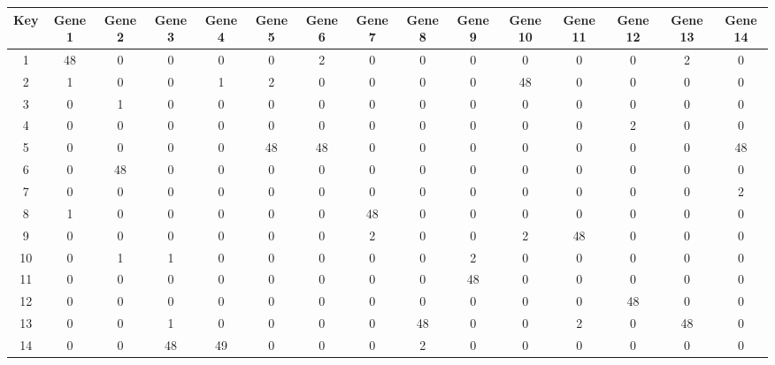 \begin{tabular}{|c|c|c|c|c|c|c|c|c|c|c|c|c|c|c|}
\hline
Key & Gene 1 & Gene 2 & Gene 3 & Gene 4 & Gene 5 & Gene 6 & Gene 7 & Gene 8 & Gene 9 & Gene 10 & Gene 11 & Gene 12 & Gene 13 & Gene 14 \\
\hline
1 & 48 & 0 & 0 & 0 & 0 & 2 & 0 & 0 & 0 & 0 & 0 & 0 & 2 & 0 \\
2 & 1 & 0 & 0 & 1 & 2 & 0 & 0 & 0 & 0 & 48 & 0 & 0 & 0 & 0 \\
3 & 0 & 1 & 0 & 0 & 0 & 0 & 0 & 0 & 0 & 0 & 0 & 0 & 0 & 0 \\
4 & 0 & 0 & 0 & 0 & 0 & 0 & 0 & 0 & 0 & 0 & 0 & 2 & 0 & 0 \\
5 & 0 & 0 & 0 & 0 & 48 & 48 & 0 & 0 & 0 & 0 & 0 & 0 & 0 & 48 \\
6 & 0 & 48 & 0 & 0 & 0 & 0 & 0 & 0 & 0 & 0 & 0 & 0 & 0 & 0 \\
7 & 0 & 0 & 0 & 0 & 0 & 0 & 0 & 0 & 0 & 0 & 0 & 0 & 0 & 2 \\
8 & 1 & 0 & 0 & 0 & 0 & 0 & 48 & 0 & 0 & 0 & 0 & 0 & 0 & 0 \\
9 & 0 & 0 & 0 & 0 & 0 & 0 & 2 & 0 & 0 & 2 & 48 & 0 & 0 & 0 \\
10 & 0 & 1 & 1 & 0 & 0 & 0 & 0 & 0 & 2 & 0 & 0 & 0 & 0 & 0 \\
11 & 0 & 0 & 0 & 0 & 0 & 0 & 0 & 0 & 48 & 0 & 0 & 0 & 0 & 0 \\
12 & 0 & 0 & 0 & 0 & 0 & 0 & 0 & 0 & 0 & 0 & 0 & 48 & 0 & 0 \\
13 & 0 & 0 & 1 & 0 & 0 & 0 & 0 & 48 & 0 & 0 & 2 & 0 & 48 & 0 \\
14 & 0 & 0 & 48 & 49 & 0 & 0 & 0 & 2 & 0 & 0 & 0 & 0 & 0 & 0 \\
\hline
\end{tabular}